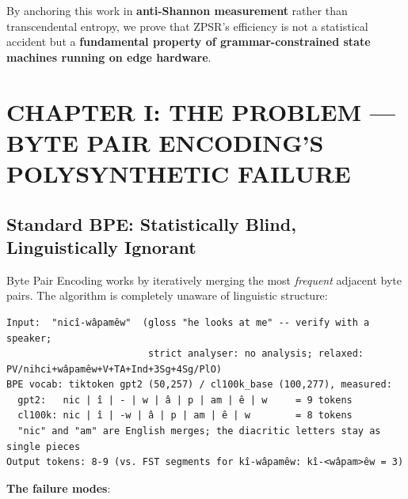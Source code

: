 \documentclass[11pt,oneside]{article}
\begin{document}
By anchoring this work in \textbf{anti-Shannon measurement} rather than transcendental entropy, we prove that ZPSR's efficiency is not a statistical accident but a \textbf{fundamental property of grammar-constrained state machines running on edge hardware}.

\section{CHAPTER I: THE PROBLEM --- BYTE PAIR ENCODING'S POLYSYNTHETIC FAILURE}

\subsection{Standard BPE: Statistically Blind, Linguistically Ignorant}

Byte Pair Encoding works by iteratively merging the most \emph{frequent} adjacent byte pairs. The algorithm is completely unaware of linguistic structure:

\begin{lstlisting}
Input:  "nicî-wâpamêw"  (gloss "he looks at me" -- verify with a speaker;
                         strict analyser: no analysis; relaxed: PV/nihci+wâpamêw+V+TA+Ind+3Sg+4Sg/PlO)
BPE vocab: tiktoken gpt2 (50,257) / cl100k_base (100,277), measured:
  gpt2:   nic | î | - | w | â | p | am | ê | w     = 9 tokens
  cl100k: nic | î | -w | â | p | am | ê | w        = 8 tokens
  "nic" and "am" are English merges; the diacritic letters stay as single pieces
Output tokens: 8-9 (vs. FST segments for kî-wâpamêw: kî-<wâpam>êw = 3)
\end{lstlisting}

\textbf{The failure modes}:
\end{document}

